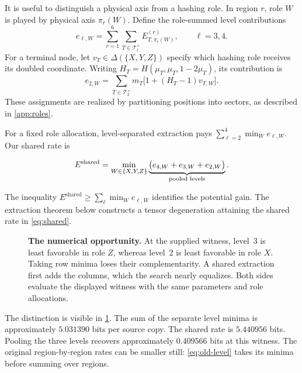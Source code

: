 \documentclass[11pt,a4paper]{article}
\newcommand{\Tpos}[1]{\mathcal T_{#1}^{+}}
\newcommand{\Eshared}{E^{\mathrm{shared}}}
\newcommand{\WW}{\{X,Y,Z\}}
\begin{document}
It is useful to distinguish a physical axis from a hashing role. In region $r$, role $W$ is played by physical axis $\pi_r(W)$. Define the role-summed level contributions
\begin{equation}\label{eq:role-sums}
e_{\ell,W}=\sum_{r=1}^6\sum_{T\in\Tpos\ell}
E_{T,\pi_r(W)}^{(r)},\qquad \ell=3,4.
\end{equation}
For a terminal node, let $v_T\in\Delta(\WW)$ specify which hashing role receives its doubled coordinate. Writing $H_T=H(\mu_T,\mu_T,1-2\mu_T)$, its contribution is
\begin{equation}\label{eq:terminal-role}
e_{2,W}=\sum_{T\in\Tpos2}m_T\bigl[1+(H_T-1)v_{T,W}\bigr].
\end{equation}
These assignments are realized by partitioning positions into sectors, as described in \cref{app:roles}.

For a fixed role allocation, level-separated extraction pays
$\sum_{\ell=2}^4\min_W e_{\ell,W}$. Our shared rate is
\begin{resultbox}
\begin{equation}\label{eq:shared}
\Eshared=\min_{W\in\WW}
\underbrace{\bigl(e_{4,W}+e_{3,W}+e_{2,W}\bigr)}_{\text{\upshape pooled levels}}.
\end{equation}
\end{resultbox}
The inequality $\Eshared\ge\sum_\ell\min_W e_{\ell,W}$ identifies the potential gain. The extraction theorem below constructs a tensor degeneration attaining the shared rate in \cref{eq:shared}.

\begin{figure}[t]
\centering

\caption{\textbf{The numerical opportunity.} At the supplied witness, level~3 is least favorable in role $Z$, whereas level~2 is least favorable in role $X$. Taking row minima loses their complementarity. A shared extraction first adds the columns, which the search nearly equalizes. Both sides evaluate the displayed witness with the same parameters and role allocations.}
\label{fig:balance}
\end{figure}

The distinction is visible in \cref{fig:balance}. The sum of the separate level minima is approximately $5.031390$ bits per source copy. The shared rate is $5.440956$ bits. Pooling the three levels recovers approximately $0.409566$ bits at this witness. The original region-by-region rates can be smaller still: \cref{eq:old-level} takes its minima before summing over regions.
\end{document}
